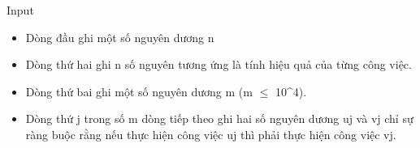 Input
\begin{itemize}
	\item Dòng đầu ghi một số nguyên dương n
	\item Dòng thứ hai ghi n số nguyên tương ứng là tính hiệu quả của từng công việc.
	\item Dòng thứ bai ghi một số nguyên dương m (m  $\le$  10^4).
	\item Dòng thứ j trong số m dòng tiếp theo ghi hai số nguyên dương uj và vj chỉ sự ràng buộc rằng nếu thực hiện công việc uj thì phải thực hiện công việc vj.
\end{itemize}